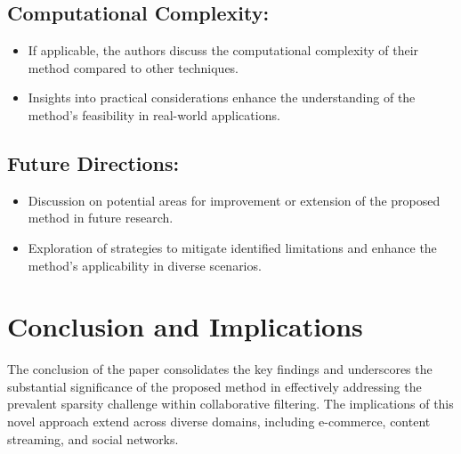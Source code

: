\documentclass{article}
\begin{document}
\subsection{Computational Complexity:}
\begin{itemize}
  \item If applicable, the authors discuss the computational complexity of their method compared to other techniques.
  \item Insights into practical considerations enhance the understanding of the method's feasibility in real-world applications.
\end{itemize}

\subsection{Future Directions:}
\begin{itemize}
  \item Discussion on potential areas for improvement or extension of the proposed method in future research.
  \item Exploration of strategies to mitigate identified limitations and enhance the method's applicability in diverse scenarios.
\end{itemize}
\section{Conclusion and Implications}
The conclusion of the paper consolidates the key findings and underscores the substantial significance of the proposed method in effectively addressing the prevalent sparsity challenge within collaborative filtering. The implications of this novel approach extend across diverse domains, including e-commerce, content streaming, and social networks.
\end{document}
